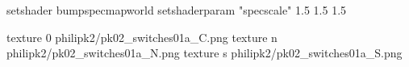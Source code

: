 setshader bumpspecmapworld
setshaderparam "specscale" 1.5 1.5 1.5

texture 0 philipk2/pk02_switches01a_C.png
texture n philipk2/pk02_switches01a_N.png
texture s philipk2/pk02_switches01a_S.png

